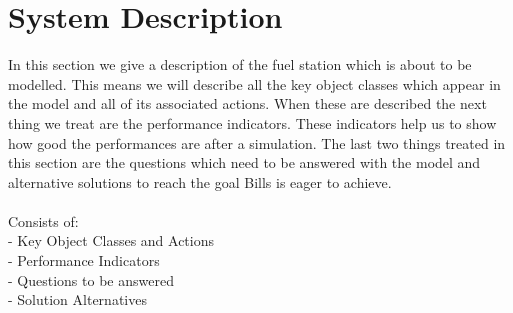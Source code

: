 \section{System Description}
In this section we give a description of the fuel station which is about to be modelled. This means we will describe all the key object classes which appear in the model and all of its associated actions. When these are described the next thing we treat are the performance indicators. These indicators help us to show how good the performances are after a simulation. The last two things treated in this section are the questions which need to be answered with the model and alternative solutions to reach the goal Bills is eager to achieve. 
\\
\\Consists of:\\
- Key Object Classes and Actions\\
- Performance Indicators\\
- Questions to be answered\\
- Solution Alternatives \\
\\
